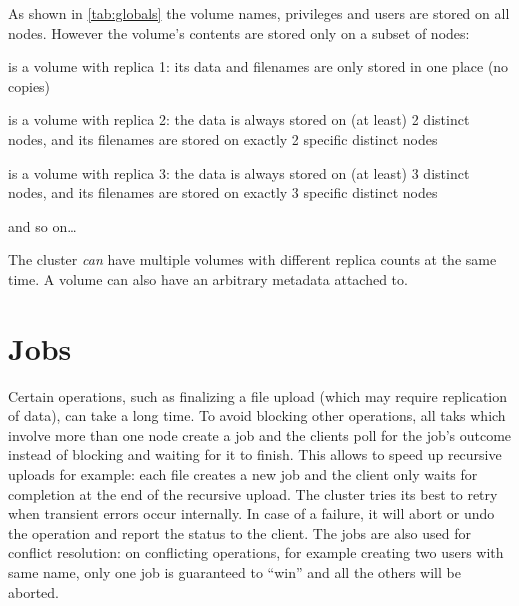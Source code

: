 As shown in {\ifpdf{}\else\ref{tab:globals}\fi} the volume
names, privileges and users are stored on all nodes. However the volume's
contents are stored only on a subset
of nodes:
\begin{description}
	\item[volA\_r1] is a volume with replica 1: its data and filenames
	are only stored in one place (no copies)
	\item[volB\_r2] is a volume with replica 2: the data is always stored
	on (at least) 2 distinct nodes, and its filenames are stored on exactly
	2 specific distinct nodes
	\item[volC\_r3] is a volume with replica 3: the data is always stored
	on (at least) 3 distinct nodes, and its filenames are stored on exactly
	3 specific distinct nodes
	\item and so on\ldots
\end{description}
The cluster \emph{can} have multiple volumes with different replica counts at
the same time. A volume can also have an arbitrary metadata attached to.


\section{Jobs}
Certain operations, such as finalizing a file upload (which may require
replication of data), can take a long time. To avoid blocking other operations,
all taks which involve more than one node create a job and the \SX clients poll
for the job's outcome instead of blocking and waiting for it to finish. This
allows to speed up recursive uploads for example: each file creates a new job
and the client only waits for completion at the end of the recursive upload.
The cluster tries its best to retry when transient errors occur internally.
In case of a failure, it will abort or undo the operation and report the status
to the client. The jobs are also used for conflict resolution: on conflicting
operations, for example creating two users with same name, only one job is
guaranteed to ``win'' and all the others will be aborted.
